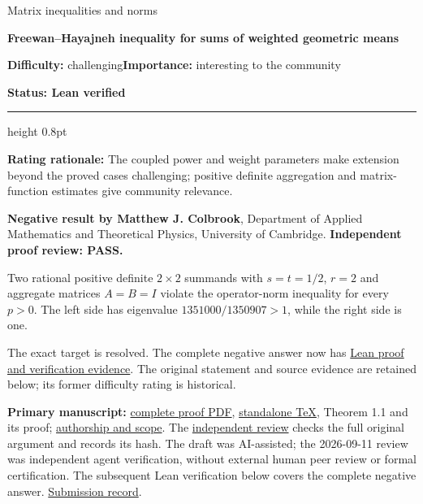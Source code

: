 \documentclass[11pt,a4paper]{article}
\makeatletter
\renewcommand{\subsection}{\Needspace{4\baselineskip}\@startsection{subsection}{2}{0pt}{9pt plus 1pt minus 1pt}{3pt}{\sffamily\bfseries\normalsize\color{ink}}}
\makeatother
\begin{document}
{\sffamily\small\color{muted}Matrix inequalities and norms\par}
\vspace{3pt}
{\raggedright{}\sffamily\bfseries\fontsize{21}{24}\selectfont\color{ink}Freewan--Hayajneh
inequality for sums of weighted geometric means\par}
\vspace{7pt}
{\sffamily\small\textbf{Difficulty:} challenging\quad\textbf{Importance:} interesting
to the community\par}
{\sffamily\small\bfseries\color{accent}Status: Lean verified\par}
\vspace{4pt}
{\color{accent}\hrule height 0.8pt}
\vspace{6pt}
\textbf{Rating rationale:} The coupled power and weight parameters make
extension beyond the proved cases challenging; positive definite
aggregation and matrix-function estimates give community relevance.

\subsection{Resolution --- 2026-09-11}\label{resolution-2026-09-11}

\textbf{Negative result by Matthew J. Colbrook}, Department of Applied
Mathematics and Theoretical Physics, University of Cambridge.
\textbf{Independent proof review: PASS.}

Two rational positive definite \(2\times2\) summands with \(s=t=1/2\),
\(r=2\) and aggregate matrices \(A=B=I\) violate the operator-norm
inequality for every \(p>0\). The left side has eigenvalue
\(1351000/1350907>1\), while the right side is one.

The exact target is resolved. The complete negative answer now has
\href{https://github.com/ajt60gaibb/OpenProblemsInNLA/blob/main/matrix-inequalities-and-norms/MI-21\#lean-proof-and-verification-evidence--2026-09-12}{Lean
proof and verification evidence}. The original statement and source
evidence are retained below; its former difficulty rating is historical.

\textbf{Primary manuscript:}
\href{https://github.com/ajt60gaibb/OpenProblemsInNLA/blob/main/matrix-inequalities-and-norms/MI-21/solution.pdf}{complete
proof PDF},
\href{https://github.com/ajt60gaibb/OpenProblemsInNLA/blob/main/matrix-inequalities-and-norms/MI-21/solution.tex}{standalone
TeX}, Theorem 1.1 and its proof;
\href{https://github.com/ajt60gaibb/OpenProblemsInNLA/blob/main/matrix-inequalities-and-norms/MI-21/solution.md}{authorship
and scope}. The
\href{https://github.com/ajt60gaibb/OpenProblemsInNLA/blob/main/references/colbrook-matrix-2026-09-11/verification/reviews/MI-21-review.md}{independent
review} checks the full original argument and records its hash. The
draft was AI-assisted; the 2026-09-11 review was independent agent
verification, without external human peer review or formal
certification. The subsequent Lean verification below covers the
complete negative answer.
\href{https://github.com/ajt60gaibb/OpenProblemsInNLA/blob/main/references/colbrook-matrix-2026-09-11/README.md}{Submission
record}.
\end{document}
